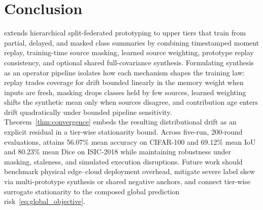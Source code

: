 \section{Conclusion}
\label{sec:conclusion}

\ehsfp{} extends hierarchical split-federated prototyping to upper tiers that train from partial, delayed, and masked class summaries by combining timestamped moment replay, training-time source masking, learned source weighting, prototype replay consistency, and optional shared full-covariance synthesis. Formulating synthesis as an operator pipeline isolates how each mechanism shapes the training law: replay trades coverage for drift bounded linearly in the memory weight when inputs are fresh, masking drops classes held by few sources, learned weighting shifts the synthetic mean only when sources disagree, and contribution age enters drift quadratically under bounded pipeline sensitivity. Theorem~\ref{thm:convergence} embeds the resulting distributional drift as an explicit residual in a tier-wise stationarity bound. Across five-run, 200-round evaluations, \ehsfp{} attains 56.07\% mean accuracy on CIFAR-100 and 69.12\% mean IoU and 80.23\% mean Dice on ISIC-2018 while maintaining robustness under masking, staleness, and simulated execution disruptions. Future work should benchmark physical edge--cloud deployment overhead, mitigate severe label skew via multi-prototype synthesis or shared negative anchors, and connect tier-wise surrogate stationarity to the composed global prediction risk~\eqref{eq:global_objective}.